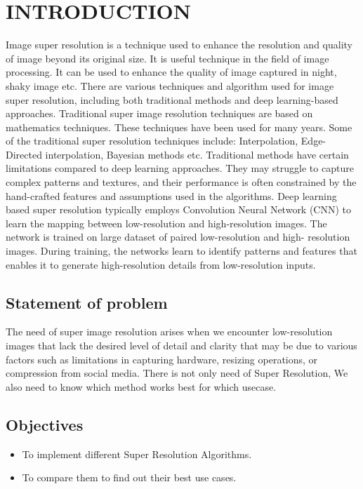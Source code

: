 \newpage
{}
\section{INTRODUCTION}
Image super resolution is a technique used to enhance the resolution and quality of
image beyond its original size. It is useful technique in the field of image processing. It
can be used to enhance the quality of image captured in night, shaky image etc. There
are various techniques and algorithm used for image super resolution, including both
traditional methods and deep learning-based approaches. Traditional super image
resolution techniques are based on mathematics techniques. These techniques have
been used for many years. Some of the traditional super resolution techniques include:
Interpolation, Edge-Directed interpolation, Bayesian methods etc. Traditional methods
have certain limitations compared to deep learning approaches. They may struggle to
capture complex patterns and textures, and their performance is often constrained by
the hand-crafted features and assumptions used in the algorithms.
Deep learning based super resolution typically employs Convolution Neural
Network (CNN) to learn the mapping between low-resolution and high-resolution
images. The network is trained on large dataset of paired low-resolution and high-
resolution images. During training, the networks learn to identify patterns and features
that enables it to generate high-resolution details from low-resolution inputs.


\subsection{Statement of problem}
The need of super image resolution arises when we encounter low-resolution images
that lack the desired level of detail and clarity that may be due to various factors such as limitations in capturing hardware, resizing
operations, or compression from social media. There is not only need of Super Resolution, We also need to know which method works best for which usecase.

\subsection{Objectives} 
\begin{itemize}
    \item To implement different Super Resolution Algorithms.
    \item To compare them to find out their best use cases.
\end{itemize}

